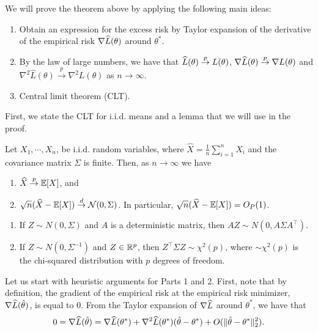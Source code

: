 
We will prove the theorem above by applying the following main ideas:
\begin{enumerate}
    \item Obtain an expression for the excess risk by Taylor expansion of the derivative of the empirical risk $\nabla \widehat{L}(\theta)$ around $\theta^{*}$.
    \item By the law of large numbers, we have that $\widehat{L}(\theta) \overset{p}{\to} L(\theta)$, $\nabla\widehat{L}(\theta) \overset{p}{\to} \nabla L(\theta)$   and  $\nabla^{2}\hat{L}(\theta) \overset{p}{\to} \nabla^{2} L(\theta)$ as $n \to \infty$.
    
    \item Central limit theorem (CLT).
\label{ideas}
\end{enumerate}
 
First, we state the CLT for i.i.d. means and a lemma that we will use in the proof.

\begin{theorem} \label{lec1:thm:CLT}
Let $X_1, \cdots, X_n$, be i.i.d. random variables, where $\widehat{X}=\frac{1}{n} \sum_{i=1}^{n} X_i$ and the covariance matrix $\Sigma$ is finite. Then, as $n \to \infty$ we have
\begin{enumerate}
    \item $\widehat{X} \overset{p}{\to} \operatorname*{\mathbb{E}}[X]$, and
    \item $\sqrt{n} (\widehat{X}-\operatorname*{\mathbb{E}}[X]) \overset{d}{\to} \mathcal{N}(0,\Sigma)$. In particular, $\sqrt{n} (\widehat{X}-\operatorname*{\mathbb{E}}[X]) = O_P(1)$.
\end{enumerate}
\end{theorem}

\begin{lemma}\label{lec1:lem:dist}
\quad\quad
    \begin{enumerate}
        \item If $Z \sim N(0, \Sigma)$ and $A$ is a deterministic matrix, then $AZ \sim N(0, A \Sigma A^\top)$.
        
        \item If $Z \sim N(0, \Sigma^{-1})$ and $Z \in \mathbb R^p$, then $Z^\top \Sigma Z \sim \chi^2(p)$, where $\sim \chi^2(p)$ is the chi-squared distribution with $p$ degrees of freedom.
    \end{enumerate}
\end{lemma}


Let us start with heuristic arguments for Parts 1 and 2. First, note that by definition, the gradient of the empirical risk at the empirical risk minimizer, $\nabla \widehat{L}(\hat{\theta})$, is equal to $0$. From the Taylor expansion of $\nabla \widehat{L}$ around $\theta^*$, we have that 
\begin{align}
    0 = \nabla \widehat{L}(\hat{\theta}) = \nabla \widehat{L}(\theta^*) + \nabla^2 \widehat{L}(\theta^*)(\hat{\theta} - \theta^*) + O(\|\hat{\theta} - \theta^*\|^2_2).
\end{align}

